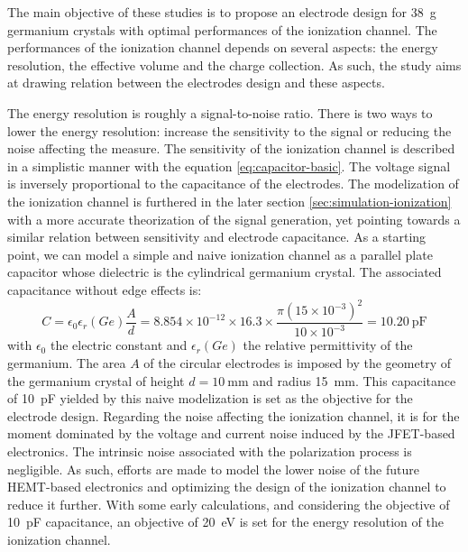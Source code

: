 The main objective of these studies is to propose an electrode design for \SI{38}{\g} germanium crystals with optimal performances of the ionization channel. The performances of the ionization channel depends on several aspects: the energy resolution, the effective volume and the charge collection. As such, the study aims at drawing relation between the electrodes design and these aspects.

The energy resolution is roughly a signal-to-noise ratio. There is two ways to lower the energy resolution: increase the sensitivity to the signal or reducing the noise affecting the measure.
The sensitivity of the ionization channel is described in a simplistic manner with the equation \ref{eq:capacitor-basic}. The voltage signal is inversely proportional to the capacitance of the electrodes. The modelization of the ionization channel is furthered in the later section \ref{sec:simulation-ionization} with a more accurate theorization of the signal generation, yet pointing towards a similar relation between sensitivity and electrode capacitance. As a starting point, we can model a simple and naive ionization channel as a parallel plate capacitor whose dielectric is the cylindrical germanium crystal. The associated capacitance without edge effects is:
\begin{equation}
\label{eq:parrallel-plate-capacitor}
C = \epsilon_0 \epsilon_r(Ge) \frac{A}{d}
=
8.854 \times 10^{-12} \times 16.3 \times \frac{\pi (15 \times 10^{-3})^2}{10 \times 10^{-3}}
=
\SI{10.20}{\pico\farad}
\end{equation}
with $\epsilon_0$ the electric constant and $\epsilon_r(Ge)$ the relative permittivity of the germanium. The area $A$ of the circular electrodes is imposed by the geometry of the germanium crystal of height $d=\SI{10}{\mm}$ and radius \SI{15}{\mm}. This capacitance of \SI{10}{\pico\farad} yielded by this naive modelization is set as the objective for the electrode design. 
Regarding the noise affecting the ionization channel, it is for the moment dominated by the voltage and current noise induced by the JFET-based electronics. The intrinsic noise associated with the polarization process is negligible. As such, efforts are made to model the lower noise of the future HEMT-based electronics and optimizing the design of the ionization channel to reduce it further. With some early calculations, and considering the objective of \SI{10}{\pico\farad} capacitance, an objective of \SI{20}{\eV} is set for the energy resolution of the ionization channel.

